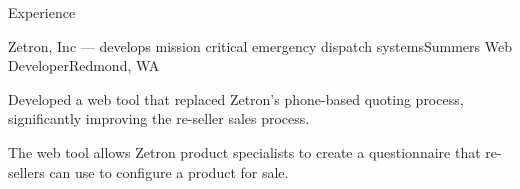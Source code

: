 \documentclass{resume} %
\begin{document}
\begin{rSection}{Experience}



\begin{rSubsection}{Zetron, Inc \textnormal{--- develops mission critical emergency dispatch systems}}{Summers }{Web Developer}{Redmond, WA}
\item Developed a web tool that replaced Zetron's phone-based quoting process, significantly improving the re-seller sales process.
\item The web tool allows Zetron product specialists to create a questionnaire that re-sellers can use to configure a product for sale.
\end{rSubsection}




\end{rSection}
\end{document}

